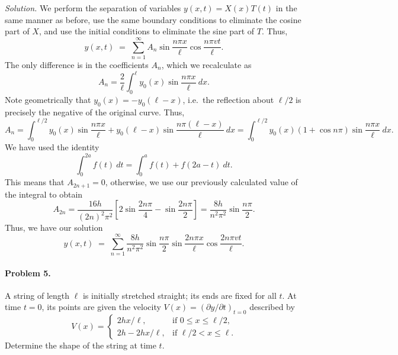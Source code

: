 \documentclass[10pt]{article}
\begin{document}
        \textit{Solution.} We perform the separation of variables $y(x, t) = X(x)T(t)$ in the same manner as before, use the
        same boundary conditions to eliminate the cosine part of $X$, and use the initial conditions to eliminate the sine part of $T$.
        Thus,
        \[
                y(x, t) \;=\; \sum_{n = 1}^\infty A_n\sin\frac{n\pi x}{\ell} \cos\frac{n\pi vt}{\ell}.
        \]
        The only difference is in the coefficients $A_n$, which we recalculate as
        \[
                A_n = \frac{2}{\ell}\int_0^\ell y_0(x) \sin\frac{n\pi x}{\ell}\: dx.
        \]
        Note geometrically that $y_0(x) = -y_0(\ell - x)$, i.e.\ the reflection about $\ell/2$ is precisely the negative of the original curve. Thus,
        \[
                A_n = \int_{0}^{\ell/2} y_0(x)\sin\frac{n\pi x}{\ell} + y_0(\ell - x)\sin\frac{n\pi(\ell - x)}{\ell}\:dx
                        = \int_{0}^{\ell/2} y_0(x)(1 + \cos{n\pi})\sin\frac{n\pi x}{\ell}\:dx.
        \]
        We have used the identity
        \[
                \int_{0}^{2a} f(t)\:dt = \int_0^a f(t) + f(2a - t)\: dt.
        \]
        This means that $A_{2n+1} = 0$, otherwise, we use our previously calculated value of the integral to obtain
        \[
                A_{2n} = \frac{16h}{(2n)^2\pi^2}\left[2\sin\frac{2n\pi}{4} - \sin\frac{2n\pi}{2}\right] = \frac{8h}{n^2\pi^2}\sin\frac{n\pi}{2}.
        \]
        Thus, we have our solution
        \[
                y(x, t) \;=\; \sum_{n = 1}^\infty \frac{8h}{n^2\pi^2}\sin\frac{n\pi}{2}\sin\frac{2n\pi x}{\ell} \cos\frac{2n\pi vt}{\ell}.
        \]

        \paragraph{Problem 5.} A string of length $\ell$ is initially stretched straight; its ends are fixed for all $t$. At time $t = 0$,
        its points are given the velocity $V(x) = (\partial y/\partial t)_{t = 0}$ described by
        \[
                V(x) = \begin{cases}
                        2hx/\ell, &\text{if } 0 \leq x \leq \ell/2, \\
                        2h - 2hx/\ell, &\text{if } \ell/2 < x \leq \ell.
                \end{cases}
        \]
        Determine the shape of the string at time $t$.\\
\end{document}
